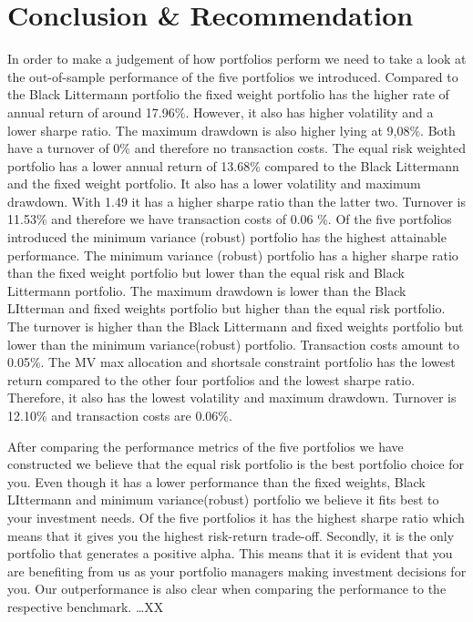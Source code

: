 \documentclass[11pt, DIV=15]{scrreprt}
\begin{document}
\chapter*{Conclusion \& Recommendation}
In order to make a judgement of how portfolios perform we need to take a look at the out-of-sample performance of the five portfolios we introduced. 
Compared to the Black Littermann portfolio the fixed weight portfolio has the higher rate of annual return of around 17.96\%. However, it also has higher volatility and a lower sharpe ratio.
The maximum drawdown is also higher lying at 9,08\%.
Both have a turnover of 0\% and therefore no transaction costs. 
The equal risk weighted portfolio has a lower annual return of 13.68\% compared to the Black Littermann and the fixed weight portfolio. It also has a lower volatility and maximum drawdown. With 1.49 it has a higher sharpe ratio than the latter two. Turnover is 11.53\% and therefore we have transaction costs of
0.06 \%. 
Of the five portfolios introduced the minimum variance (robust) portfolio has the highest attainable performance.
The minimum variance (robust) portfolio has a higher sharpe ratio than the fixed weight portfolio but lower than the equal risk and Black Littermann portfolio.
The maximum drawdown is lower than the Black LItterman and fixed weights portfolio but higher than the equal risk portfolio.
The turnover is higher than the Black Littermann and fixed weights portfolio but lower than the minimum variance(robust) portfolio.
Transaction costs amount to 0.05\%.
The MV max allocation and shortsale constraint portfolio has the lowest return compared to the other four portfolios and the lowest sharpe ratio. Therefore, it also has the lowest volatility and maximum drawdown.
Turnover is 12.10\% and transaction costs are 0.06\%. 

After comparing the performance metrics of the five portfolios we have constructed we believe that the equal risk portfolio is the best portfolio choice for you.
Even though it has a lower performance than the fixed weights, Black LIttermann and minimum variance(robust) portfolio we believe it fits best to your investment needs.
Of the five portfolios it has the highest sharpe ratio which means that it gives you the highest risk-return trade-off.
Secondly, it is the only portfolio that generates a positive alpha.
This means that it is evident that you are benefiting from us as your portfolio managers making investment decisions for you.
Our outperformance is also clear when comparing the performance to the respective benchmark. …XX
\end{document}
